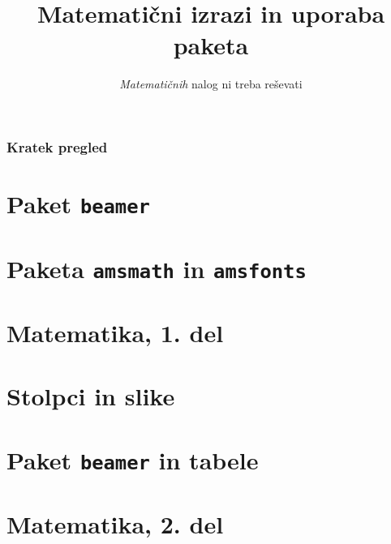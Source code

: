 \documentclass[14pt]{beamer}
\begin{document}
\title{Matematični izrazi in uporaba paketa}
\subtitle {\emph{Matematičnih} nalog ni treba reševati}
\date{}

\frame{\titlepage}

\begin{frame}
    \frametitle{Kratek pregled}
    \tableofcontents%
\end{frame}

\section{Paket \texttt{beamer}}


\section{Paketa \texttt{amsmath} in \texttt{amsfonts}}


\section[Matematika, 1. del\\\large{Analiza, logika, množice}]{Matematika, 1. del}

\section{Stolpci in slike}

\section{Paket \texttt{beamer} in tabele}

\section[Matematika, 2. del\\\large{Zaporedja, algebra, grupe}]{Matematika, 2. del}

\end{document}
